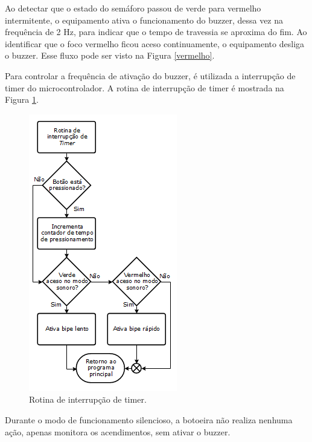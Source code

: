 Ao detectar que o estado do semáforo passou de verde para vermelho intermitente, o equipamento ativa o funcionamento do buzzer, dessa vez na frequência de 2 Hz, para indicar que o tempo de travessia se aproxima do fim. Ao identificar que o foco vermelho ficou aceso continuamente, o equipamento desliga o buzzer. Esse fluxo pode ser visto na Figura \ref{vermelho}.

Para controlar a frequência de ativação do buzzer, é utilizada a interrupção de timer do microcontrolador. A rotina de interrupção de timer é mostrada na Figura \ref{timer}.

\begin{figure}[ht]
    \begin{center}
    \includegraphics{figuras/rotina_timer.PNG}
    \end{center}
    \caption[Timer da botoeira]{Rotina de interrupção de timer.}
    \label{timer}
\end{figure}

Durante o modo de funcionamento silencioso, a botoeira não realiza nenhuma ação, apenas monitora os acendimentos, sem ativar o buzzer.

